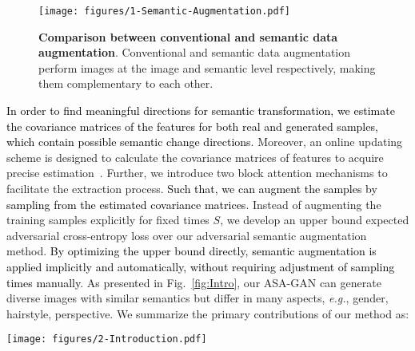 \documentclass[10pt,journal,compsoc]{IEEEtran}
\newcommand{\revise}[1]{\textcolor{black}{#1}}
\begin{document}
\begin{figure}
  \centering
  \texttt{[image: figures/1-Semantic-Augmentation.pdf]}
  \caption{
  \textbf{Comparison between conventional and semantic data augmentation}.
  Conventional and semantic data augmentation perform images at the image and semantic level respectively, making them complementary to each other.
  }
  \label{fig:semantic-augmentation}
  \vspace{-4mm}
\end{figure}

\revise{In order to find meaningful directions for semantic transformation, we estimate the covariance matrices of the features for both real and generated samples, which contain possible semantic change directions}.
%
Moreover, an online updating scheme is designed to calculate the covariance matrices of features to acquire precise estimation~\cite{ISDATPAMI2021}.
%
Further, we introduce two block attention mechanisms to facilitate the extraction process.
%
\revise{Such that,  we can augment the samples by sampling from the estimated covariance matrices}.
%
Instead of augmenting the training samples explicitly for fixed times $S$, we develop an upper bound expected adversarial cross-entropy loss over our adversarial semantic augmentation method.
%
\revise{By optimizing the upper bound directly, semantic augmentation is applied implicitly and automatically, without requiring adjustment of sampling times manually}. 
%
As presented in Fig.~\ref{fig:Intro}, our ASA-GAN can generate diverse images with similar semantics but differ in many aspects, \emph{e.g.}, gender, hairstyle, perspective.
%
We summarize the primary contributions of our method as:

\begin{figure*}
  \centering
  \texttt{[image: figures/2-Introduction.pdf]}
  \caption{\textbf{Adversarial Semantic Augmentation for Training GANs under Limited Data.}
      (\emph{left}) Synthetic images of high fidelity and diversity produced by our model trained on the limited MetFace~\cite{karras2020training} dataset. These synthetic images share similar semantics but varying details such as age, gender, hairstyle, etc.
      (\emph{right}) FID (lower is better) comparison results of our method with state-of-the-art method FastGAN~\cite{liu2021towards} on 100-shot datasets (with only $100$ training images). }
  \label{fig:Intro}
  \vspace{-4mm}
\end{figure*}
\end{document}
